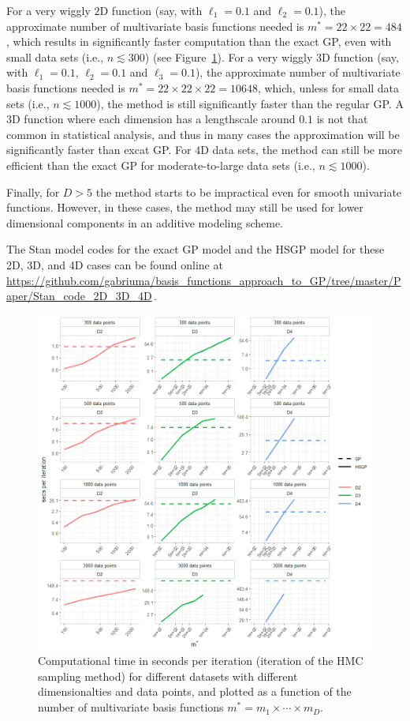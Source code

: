 For a very wiggly $2$D function (say, with $\ell_1=0.1$ and $\ell_2=0.1$), the approximate number of multivariate basis functions needed is $m^*=22\times 22= 484$, which results in significantly faster computation than the exact GP, even with small data sets (i.e., $n \lesssim 300$) (see Figure~\ref{fig14_time_nD_log}). For a very wiggly $3$D function (say, with $\ell_1=0.1$, $\ell_2=0.1$ and $\ell_3=0.1$), the approximate number of multivariate basis functions needed is $m^*=22\times 22\times 22= 10648$, which, unless for small data sets (i.e., $n \lesssim 1000$), the method is still significantly faster than the regular GP. A $3$D function where each dimension has a lengthscale around $0.1$ is not that common in statistical analysis, and thus in many cases the approximation will be significantly faster than excat GP. For $4$D data sets, the method can still be more efficient than the exact GP for moderate-to-large data sets (i.e., $n \lesssim 1000$). 

Finally, for $D>5$ the method starts to be impractical even for smooth univariate functions. However, in these cases, the method may still be used for lower dimensional components in an additive modeling scheme.

The Stan model codes for the exact GP model and the HSGP model for these 2D, 3D, and 4D cases can be found online at {\small \url{https://github.com/gabriuma/basis_functions_approach_to_GP/tree/master/Paper/Stan_code_2D_3D_4D}}\,.

\begin{figure}
\centering
\includegraphics[width=\textwidth, trim = 0mm 0mm 0mm 0mm, clip]{fig14_time_nD_log.png}
\caption{Computational time in seconds per iteration (iteration of the HMC sampling method) for different datasets with different dimensionalties and data points, and plotted as a function of the number of multivariate basis functions $m^*=m_1\times \cdots \times m_D$.}
  \label{fig14_time_nD_log}
\end{figure}

